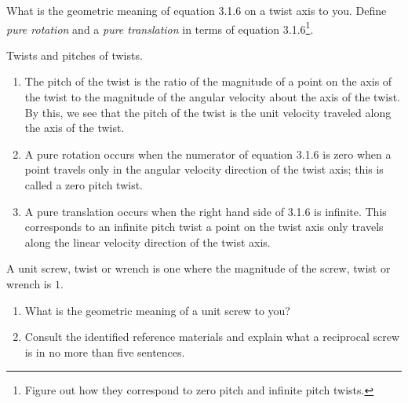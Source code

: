 
\noindent 
\begin{homework}
	What is the geometric meaning of equation 3.1.6 on a twist axis to you. Define \textit{pure rotation} and a \textit{pure translation} in terms of equation 3.1.6\footnote{Figure out how they correspond to zero pitch and infinite pitch twists.}. 
\end{homework} 

\begin{solution}
	Twists and pitches of twists.
	\begin{enumerate}
		\item The pitch of the twist is the ratio of the magnitude of a point on the axis of the twist to the magnitude of the angular velocity about the axis of the twist. By this, we see that the pitch of the twist is the unit velocity traveled along the axis of the twist.
		\item A pure rotation occurs when the numerator of equation 3.1.6 is zero \ie when a point travels only in the angular velocity direction of the twist axis; this is called a zero pitch twist.
		\item A pure translation occurs when the right hand side of 3.1.6 is infinite. This corresponds to an infinite pitch twist \ie a point on the twist axis only travels along the linear velocity direction of the twist axis.
	\end{enumerate}
\end{solution}

\noindent 
\begin{homework}
	A unit screw, twist or wrench is one where the magnitude of the screw, twist or wrench is $1$.  
	\begin{enumerate}
		\item  What is the geometric meaning of a unit screw to you? 
		\item Consult the identified reference materials and explain what a reciprocal screw is in no more than five sentences.
	\end{enumerate}
\end{homework}

